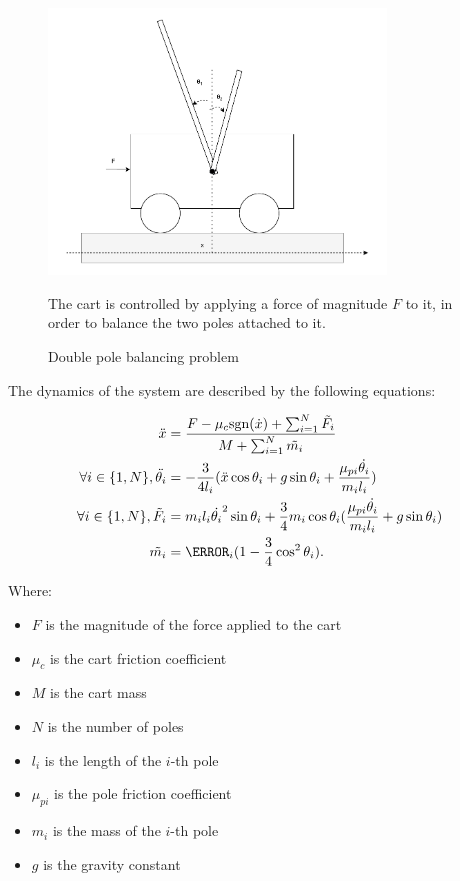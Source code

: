 \begin{figure}
    \centering
    \includegraphics[width=0.8\textwidth]{Pictures/cart_pole}
    \caption{Double pole balancing problem}{The cart is controlled by applying a force of magnitude $F$ to it, in order to balance the two poles attached to it.}
    \label{fig:pole_balancing}
\end{figure}

The dynamics of the system are described by the following equations:

\[
    \begin{aligned}
        \ddot{x} &= \frac{F - \mu_c \text{sgn}(\dot{x}) + \sum_{i = 1}^N \tilde{F_i}}{M + \sum_{i = 1}^N \tilde{m_i}} \\
        \forall i \in \{1, N\}, \ddot{\theta_i} &= - \frac{3}{4 l_i} (\ddot{x} \cos \theta_i + g \sin \theta_i + \frac{\mu_{pi} \dot{\theta_i}}{m_i l_i})\\
        \forall i \in \{1, N\}, \tilde{F_i} &= m_i l_i \dot{\theta_i}^2 \sin \theta_i + \frac{3}{4} m_i \cos \theta_i (\frac{\mu_{pi} \dot{\theta_i}}{m_i l_i} + g \sin \theta_i) \\
        \tilde{m_i} &= \m_i (1 - \frac{3}{4} \cos^2 \theta_i). \\
    \end{aligned}
\]

Where:

\begin{itemize}
    \item $F$ is the magnitude of the force applied to the cart
    \item $\mu_c$ is the cart friction coefficient
    \item $M$ is the cart mass
    \item $N$ is the number of poles
    \item $l_i$ is the length of the $i$-th pole
    \item $\mu_{pi}$ is the pole friction coefficient
    \item $m_i$ is the mass of the $i$-th pole
    \item $g$ is the gravity constant
\end{itemize}

